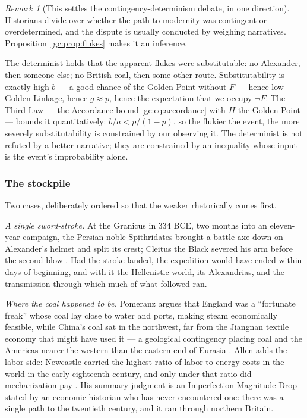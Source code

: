 \documentclass[11pt]{article}
\numberwithin{equation}{section}
\theoremstyle{plain}
\theoremstyle{definition}
\theoremstyle{remark}
\newtheorem{remark}[theorem]{Remark}
\begin{document}
\begin{remark}[This settles the contingency-determinism debate, in one
direction]\label{gc:rem:determinism}
Historians divide over whether the path to modernity was contingent or
overdetermined, and the dispute is usually conducted by weighing
narratives. Proposition~\ref{gc:prop:flukes} makes it an inference.

The determinist holds that the apparent flukes were substitutable: no
Alexander, then someone else; no British coal, then some other route.
Substitutability is exactly high $b$ --- a good chance of the Golden
Point without $F$ --- hence low Golden Linkage, hence $g \approx p$,
hence the expectation that we occupy $\neg F$. The Third Law --- the
Accordance bound \eqref{gc:eq:accordance} with $H$ the Golden Point ---
bounds it quantitatively: $b/a < p/(1-p)$, so the flukier the event, the more
severely substitutability is constrained by our observing it. The
determinist is not refuted by a better narrative; they are constrained
by an inequality whose input is the event's improbability alone.
\end{remark}

\subsubsection{The stockpile}\label{gc:subsub:stockpile}

Two cases, deliberately ordered so that the weaker rhetorically comes
first.

\emph{A single sword-stroke.} At the Granicus in 334 BCE, two months
into an eleven-year campaign, the Persian noble Spithridates brought a
battle-axe down on Alexander's helmet and split its crest; Cleitus the
Black severed his arm before the second blow \cite{Arrian,
PlutarchAlex}. Had the stroke landed, the expedition would have ended
within days of beginning, and with it the Hellenistic world, its
Alexandrias, and the transmission through which much of what followed
ran.

\emph{Where the coal happened to be.} Pomeranz argues that England was
a ``fortunate freak'' whose coal lay close to water and ports, making
steam economically feasible, while China's coal sat in the northwest,
far from the Jiangnan textile economy that might have used it ---
a geological contingency placing coal and the Americas nearer the
western than the eastern end of Eurasia \cite{Pomeranz00}. Allen adds
the labor side: Newcastle carried the highest ratio of labor to energy
costs in the world in the early eighteenth century, and only under that
ratio did mechanization pay \cite{Allen09}. His summary judgment is
an Imperfection Magnitude Drop stated by an economic historian who has
never encountered one: there was a single path to the twentieth century,
and it ran through northern Britain.
\end{document}
